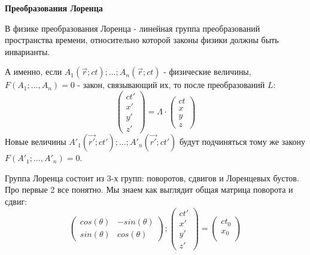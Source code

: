 \documentclass[12pt]{article}
\begin{document}
\begin{large}
\begin{center}
\LARGE \textbf{Преобразования Лоренца}
\end{center}
\par В физике преобразования Лоренца - линейная группа преобразований пространства времени,
относительно которой законы физики должны быть инварианты.
\par А именно, если $A_1(\vec{r}; ct); \dots; A_n(\vec{r}; ct)$ - физические величины,
\newline $F(A_1; \dots, A_n) = 0$ - закон, связывающий их, то после преобразований $L$:
    \begin{equation}
        \begin{pmatrix}
            ct'\\
            x'\\
            y'\\
            z'
        \end{pmatrix}
        = \Lambda \cdot
        \begin{pmatrix}
            ct\\
            x\\
            y\\
            z
        \end{pmatrix}
    \end{equation}
Новые величины $A'_1(\vec{r'}; ct'); \dots; A'_n(\vec{r'}; ct')$ будут подчиняться тому же закону
\newline $F(A'_1; \dots, A'_n) = 0$.
    \par Группа Лоренца состоит из 3-х групп: поворотов, сдвигов и Лоренцевых бустов.
    Про первые 2 все понятно. Мы знаем как выглядит общая матрица поворота и сдвиг:
    \begin{equation}
        \begin{pmatrix}
            cos(\theta) & -sin(\theta)\\
            sin(\theta) & cos(\theta)
        \end{pmatrix};
        \begin{pmatrix}
            ct'\\
            x'\\
            y'\\
            z'
        \end{pmatrix}
        =
        \begin{pmatrix}
            ct_0\\
            x_0\\

\end{pmatrix}
\end{equation}
\end{large}
\end{document}
